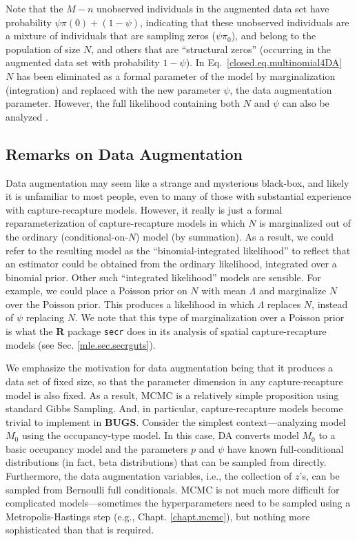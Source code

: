 Note that the $M-n$ unobserved individuals in the augmented data set
have probability $\psi \pi(0) + (1-\psi)$, indicating that these
unobserved individuals are a mixture of individuals that are sampling
zeros ($\psi \pi_0$), and belong to the population of size $N$, and
others that are ``structural zeros'' (occurring in the augmented data
set with probability $1 - \psi$). In Eq.~\ref{closed.eq.multinomial4DA} $N$
has been eliminated as a formal parameter of the model by
marginalization (integration) and replaced with the new parameter
$\psi$, the data augmentation parameter.
However, the full likelihood containing both $N$ and $\psi$ can also be
analyzed \citep[see][]{royle_etal:2007}.


\subsection{Remarks on Data Augmentation}
\label{closed.sec.remarks}

Data augmentation may seem like a strange and mysterious black-box,
and likely it is unfamiliar to most people, even to many of those with substantial
experience with capture-recapture models. However, it really is just a
formal reparameterization of capture-recapture models in which $N$ is
marginalized out of the ordinary (conditional-on-$N$) model (by summation).
As a result, we could refer to the resulting model as the 
``binomial-integrated likelihood'' to reflect that an estimator could
be obtained from the ordinary likelihood, integrated over a binomial
prior. Other such ``integrated likelihood'' models are sensible. For
example, we could place a Poisson prior on $N$ with mean $\Lambda$ and
marginalize $N$ over the Poisson prior. This produces a likelihood in
which $\Lambda$ replaces $N$, instead of $\psi$ replacing $N$.  We
note that this type of marginalization over a Poisson prior is what
the {\bf R} package \mbox{\tt secr} does in its analysis of spatial
capture-recapture models (see Sec. \ref{mle.sec.secrguts}).


We emphasize the motivation for data augmentation being that it
produces a data set of fixed size, so that the parameter dimension in
any capture-recapture model is also fixed.  As a result, MCMC is a
relatively simple proposition using standard Gibbs Sampling.  And, in
particular, capture-recapture models become trivial to implement in
{\bf BUGS}. Consider the simplest context---analyzing model $M_0$
using the occupancy-type model. In this case, DA converts model $M_0$
to a basic occupancy model and the parameters $p$ and $\psi$ have
known full-conditional distributions (in fact, beta distributions)
that can be sampled from directly.  Furthermore, the data augmentation
variables, i.e., the collection of $z$'s, can be sampled from
Bernoulli full conditionals. MCMC is not much more difficult for
complicated models---sometimes the hyperparameters need to be sampled
using a Metropolis-Hastings step (e.g., Chapt. \ref{chapt.mcmc}), but
nothing more sophisticated than that is required.

